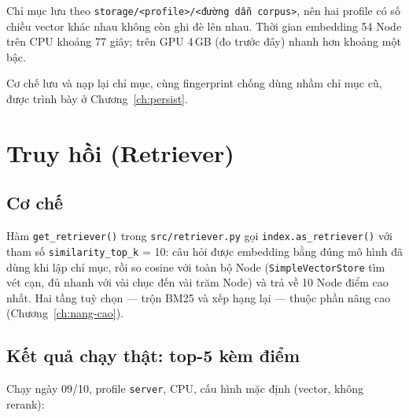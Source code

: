 Chỉ mục lưu theo \texttt{storage/<profile>/<đường dẫn corpus>}, nên hai profile có số chiều vector
khác nhau không còn ghi đè lên nhau. Thời gian embedding 54 Node trên CPU khoảng 77 giây; trên GPU
4\,GB (đo trước đây) nhanh hơn khoảng một bậc.

Cơ chế lưu và nạp lại chỉ mục, cùng fingerprint chống dùng nhầm chỉ mục cũ, được trình bày ở
Chương~\ref{ch:persist}.

\section{Truy hồi (Retriever)}
\label{sec:retriever}

\subsection{Cơ chế}

Hàm \texttt{get\_retriever()} trong \texttt{src/retriever.py} gọi \texttt{index.as\_retriever()} với tham số \texttt{similarity\_top\_k} = 10:
câu hỏi được embedding bằng đúng mô hình đã dùng khi lập chỉ mục, rồi so cosine với toàn bộ Node
(\texttt{SimpleVectorStore} tìm vét cạn, đủ nhanh với vài chục đến vài trăm Node) và trả về 10 Node điểm
cao nhất. Hai tầng tuỳ chọn --- trộn BM25 và xếp hạng lại --- thuộc phần nâng cao (Chương~\ref{ch:nang-cao}).

\subsection{Kết quả chạy thật: top-5 kèm điểm}

Chạy ngày 09/10, profile \texttt{server}, CPU, cấu hình mặc định (vector, không rerank):

